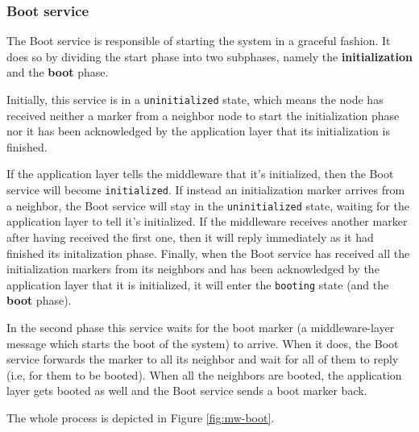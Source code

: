 \subsubsection{Boot service}

The Boot service is responsible of starting the system in a graceful fashion.
It does so by dividing the start phase into two subphases, namely the
\textbf{initialization} and the \textbf{boot} phase.

Initially, this service is in a \texttt{uninitialized} state, which means the
node has received neither a marker from a neighbor node to start the
initialization phase nor it has been acknowledged by the application layer that
its initialization is finished.

If the application layer tells the middleware that it's initialized, then the
Boot service will become \texttt{initialized}. If instead an initialization
marker arrives from a neighbor, the Boot service will stay in the
\texttt{uninitialized} state, waiting for the application layer to tell it's
initialized.
If the middleware receives another marker after having received the first one,
then it will reply immediately as it had finished its initalization phase.
Finally, when the Boot service has received all the initialization markers from
its neighbors and has been acknowledged by the application layer that it is
initialized, it will enter the \texttt{booting} state (and the \textbf{boot}
phase).

In the second phase this service waits for the boot marker (a middleware-layer
message which starts the boot of the system) to arrive. When it does, the Boot
service forwards the marker to all its neighbor and wait for all of them to
reply (i.e, for them to be booted).
When all the neighbors are booted, the application layer gets booted as
well and the Boot service sends a boot marker back.

The whole process is depicted in Figure \ref{fig:mw-boot}.

